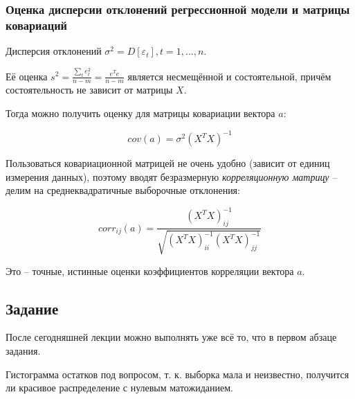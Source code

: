 \documentclass[main.tex]{subfiles}
\begin{document}
\subsubsection{Оценка дисперсии отклонений регрессионной модели и матрицы ковариаций}

Дисперсия отклонений $ \sigma^2 = D[\varepsilon_t], t = 1, ..., n $.

Её оценка $ s^2 = \frac{\sum_t e_t^2}{ n-m } = \frac{e^T e}{n - m} $ является несмещённой и состоятельной, причём состоятельность не зависит от матрицы $ X $.

Тогда можно получить оценку для матрицы ковариации вектора $ a $:

$$ cov(a) = \sigma^2 (X^T X)^{-1} $$

Пользоваться ковариационной матрицей не очень удобно (зависит от единиц измерения данных), поэтому вводят безразмерную \emph{корреляционную матрицу} --  делим на среднеквадратичные выборочные отклонения:

$$ corr_{ij}(a) = \frac{(X^T X)_{ij}^{-1}}{\sqrt{(X^T X)_{ii}^{-1} (X^T X)_{jj}^{-1}}} $$

Это -- точные, истинные оценки коэффициентов корреляции вектора $ a $.

\subsection{Задание}

После сегодняшней лекции можно выполнять уже всё то, что в первом абзаце задания.

Гистограмма остатков под вопросом, т. к. выборка мала и неизвестно, получится ли красивое распределение с нулевым матожиданием.
\end{document}
